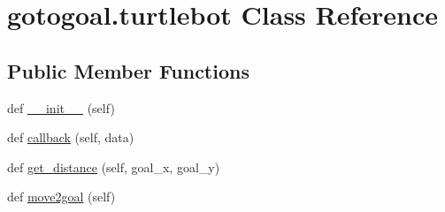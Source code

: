\hypertarget{classgotogoal_1_1turtlebot}{}\section{gotogoal.\+turtlebot Class Reference}
\label{classgotogoal_1_1turtlebot}
\subsection*{Public Member Functions}
\begin{DoxyCompactItemize}
\item 
def \hyperlink{classgotogoal_1_1turtlebot_a0c345bfb04a77eee5a248147b2c76729}{\+\_\+\+\_\+init\+\_\+\+\_\+} (self)
\item 
def \hyperlink{classgotogoal_1_1turtlebot_af658b74058b892540fc757e3c58bacaa}{callback} (self, data)
\item 
def \hyperlink{classgotogoal_1_1turtlebot_ae558dc7fda73dc9131f4b02236db00b6}{get\+\_\+distance} (self, goal\+\_\+x, goal\+\_\+y)
\item 
def \hyperlink{classgotogoal_1_1turtlebot_a9f4bd953716ed43afe8ffedf9d4ff9c7}{move2goal} (self)
\end{DoxyCompactItemize}
